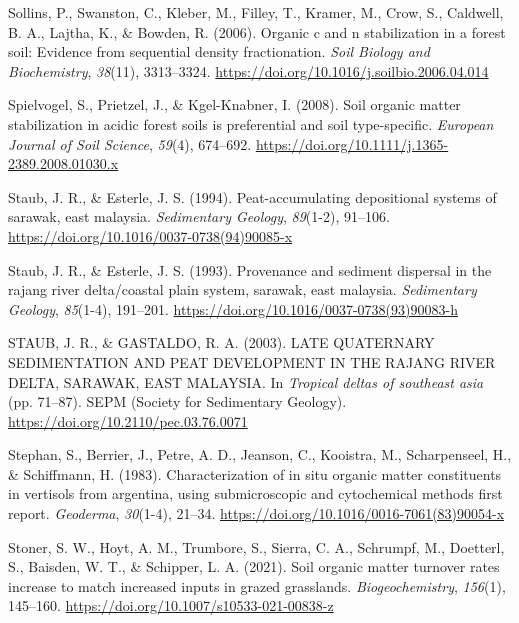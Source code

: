 \documentclass[]{article}
\begin{document}
\leavevmode\hypertarget{ref-Sollins_2006}{}%
Sollins, P., Swanston, C., Kleber, M., Filley, T., Kramer, M., Crow, S.,
Caldwell, B. A., Lajtha, K., \& Bowden, R. (2006). Organic c and n
stabilization in a forest soil: Evidence from sequential density
fractionation. \emph{Soil Biology and Biochemistry}, \emph{38}(11),
3313--3324. \url{https://doi.org/10.1016/j.soilbio.2006.04.014}

\leavevmode\hypertarget{ref-Spielvogel_2008}{}%
Spielvogel, S., Prietzel, J., \& Kgel-Knabner, I. (2008). Soil organic
matter stabilization in acidic forest soils is preferential and soil
type-specific. \emph{European Journal of Soil Science}, \emph{59}(4),
674--692. \url{https://doi.org/10.1111/j.1365-2389.2008.01030.x}

\leavevmode\hypertarget{ref-Staub_1994}{}%
Staub, J. R., \& Esterle, J. S. (1994). Peat-accumulating depositional
systems of sarawak, east malaysia. \emph{Sedimentary Geology},
\emph{89}(1-2), 91--106.
\url{https://doi.org/10.1016/0037-0738(94)90085-x}

\leavevmode\hypertarget{ref-Staub_1993}{}%
Staub, J. R., \& Esterle, J. S. (1993). Provenance and sediment
dispersal in the rajang river delta/coastal plain system, sarawak, east
malaysia. \emph{Sedimentary Geology}, \emph{85}(1-4), 191--201.
\url{https://doi.org/10.1016/0037-0738(93)90083-h}

\leavevmode\hypertarget{ref-STAUB_2003}{}%
STAUB, J. R., \& GASTALDO, R. A. (2003). LATE QUATERNARY SEDIMENTATION
AND PEAT DEVELOPMENT IN THE RAJANG RIVER DELTA, SARAWAK, EAST MALAYSIA.
In \emph{Tropical deltas of southeast asia} (pp. 71--87). SEPM (Society
for Sedimentary Geology). \url{https://doi.org/10.2110/pec.03.76.0071}

\leavevmode\hypertarget{ref-Stephan_1983}{}%
Stephan, S., Berrier, J., Petre, A. D., Jeanson, C., Kooistra, M.,
Scharpenseel, H., \& Schiffmann, H. (1983). Characterization of in situ
organic matter constituents in vertisols from argentina, using
submicroscopic and cytochemical methods first report. \emph{Geoderma},
\emph{30}(1-4), 21--34.
\url{https://doi.org/10.1016/0016-7061(83)90054-x}

\leavevmode\hypertarget{ref-Stoner_2021}{}%
Stoner, S. W., Hoyt, A. M., Trumbore, S., Sierra, C. A., Schrumpf, M.,
Doetterl, S., Baisden, W. T., \& Schipper, L. A. (2021). Soil organic
matter turnover rates increase to match increased inputs in grazed
grasslands. \emph{Biogeochemistry}, \emph{156}(1), 145--160.
\url{https://doi.org/10.1007/s10533-021-00838-z}
\end{document}
